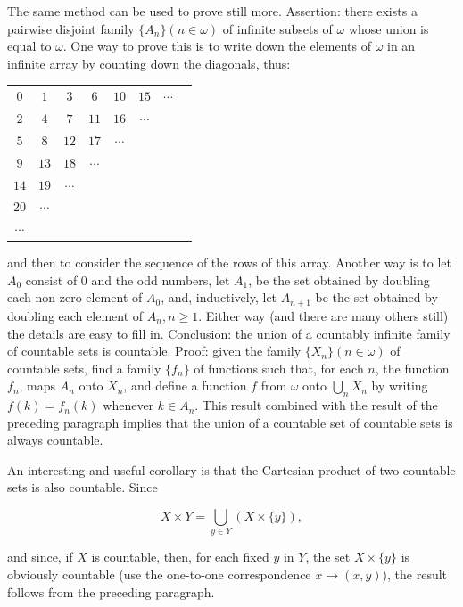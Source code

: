 The same method can be used to prove still more. Assertion: there exists a pairwise disjoint family $\{ A_{n} \} (n \in \omega)$ of infinite subsets of $\omega$ whose union is equal to $\omega$. One way to prove this is to write down the elements of $\omega$ in an infinite array by counting down the diagonals, thus: 

\begin{center}
\begin{tabular}{cccccccc}
$0$ & $1$ & $3$ & $6$ & $10$ & $15$ & $\cdots$  \\
$2$ & $4$ & $7$ & $11$ & $16$ & $\cdots$ & & \\
$5$ & $8$ & $12$ & $17$ & $\cdots$ & & & \\
$9$ & $13$ & $18$ & $\cdots$ & & & & \\
$14$ & $19$ & $\cdots$ & & & & & \\
$20$ & $\cdots$ & & & & & & \\
$\cdots $ & & & & & & & 
\end{tabular}
\end{center}

and then to consider the sequence of the rows of this array. Another way is to let $A_{0}$ consist of 0 and the odd numbers, let $A_{1}$, be the set obtained by doubling each non-zero element of $A_{0}$, and, inductively, let $A_{n+1}$ be the set obtained by doubling each element of $A_{n}, n \ge 1$. Either way (and there are many others still) the details are easy to fill in. Conclusion: the union of a countably infinite family of countable sets is countable. Proof: given the family $\{ X_{n} \} (n \in \omega)$ of countable sets, find a family $\{ f_{n} \}$ of functions such that, for each $n$, the function $f_{n}$, maps $A_{n}$ onto $X_{n}$, and define a function $f$ from $\omega$ onto $\bigcup_{n} X_{n}$ by writing $f(k) = f_{n}(k)$ whenever $k \in A_{n}$. This result combined with the result of the preceding paragraph implies that the union of a countable set of countable sets is always countable. 

An interesting and useful corollary is that the Cartesian product of two countable sets is also countable. Since 

\begin{equation*}
X \times Y = \bigcup_{y \in Y}(X \times \{ y \}),
\end{equation*}

and since, if $X$ is countable, then, for each fixed $y$ in $Y$, the set $X \times \{ y \}$ is obviously countable (use the one-to-one correspondence $x \rightarrow (x,y)$), the result follows from the preceding paragraph. 


